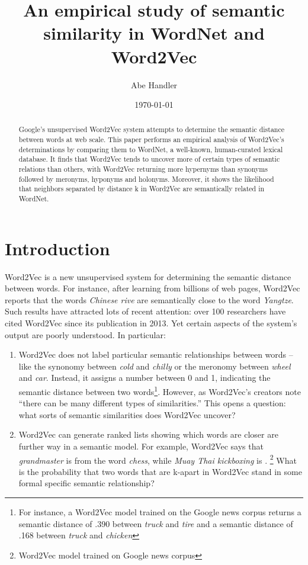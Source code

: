 \documentclass{article}
\title{An empirical study of semantic similarity in WordNet and Word2Vec}
\author{Abe Handler}
\date{\today}
\begin{document}
\begin{abstract}
Google's unsupervised Word2Vec system attempts to determine the semantic distance between words at web scale. This paper performs an empirical analysis of Word2Vec's determinations by comparing them to WordNet, a well-known, human-curated lexical database. It finds that Word2Vec tends to uncover more of certain types of semantic relations than others, with Word2Vec returning more hypernyms than synonyms followed by meronyms, hyponyms and holonyms. Moreover, it shows the likelihood that neighbors separated by distance k in Word2Vec are semantically related in WordNet.
\end{abstract}

\maketitle

\section{Introduction}

Word2Vec is a new unsupervised system for determining the semantic distance between words. For instance, after learning from billions of web pages, Word2Vec reports that the words \textit{Chinese rive} are semantically close to the word \textit{Yangtze}. \cite{Word2VecWebsite} Such results have attracted lots of recent attention: over 100 researchers have cited Word2Vec since its publication in 2013. Yet certain aspects of the system's output are poorly understood. In particular: 

\begin{enumerate}
\item Word2Vec does not label particular semantic relationships between words -- like the synonomy between \textit{cold} and \textit{chilly} or the meronomy between \textit{wheel} and \textit{car}. Instead, it assigns a number between 0 and 1, indicating the semantic distance between two words\footnote{For instance, a Word2Vec model trained on the Google news corpus returns a semantic distance of .390 between \textit{truck} and \textit{tire} and a semantic distance of .168 between \textit{truck} and \textit{chicken}}. However, as Word2Vec’s creators note ``there can be many different types of similarities.” \cite{mikolov2013efficient} This opens a question: what sorts of semantic similarities does Word2Vec uncover?

\item Word2Vec can generate ranked lists showing which words are closer are further way in a semantic model. For example, Word2Vec says that \textit{grandmaster} is  from the word \textit{chess}, while \textit{Muay Thai kickboxing} is . \footnote{Word2Vec model trained on Google news corpus} What is the probability that two words that are k-apart in Word2Vec stand in some formal specific semantic relationship?
\end{enumerate}
\end{document}
